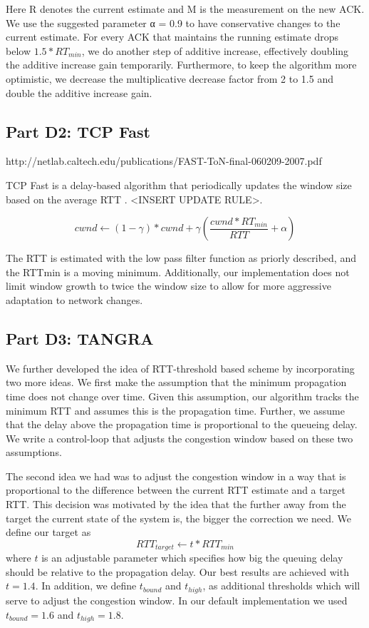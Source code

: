 \documentclass[12pt]{article}
\begin{document}
Here R denotes the current estimate and M is the measurement on the new ACK. We
use the suggested parameter α = 0.9 to have conservative changes to the current
estimate. For every ACK that maintains the running estimate drops below
$1.5*RT_{min}$, we do another step of additive increase, effectively doubling
the additive increase gain temporarily. Furthermore, to keep the algorithm more
optimistic, we decrease the multiplicative decrease factor from 2 to 1.5 and
double the additive increase gain.

\subsection*{Part D2: TCP Fast}

http://netlab.caltech.edu/publications/FAST-ToN-final-060209-2007.pdf

TCP Fast is a delay-based algorithm that periodically updates the window size
based on the average RTT \cite{jacobson}. <INSERT UPDATE RULE>.

$$cwnd \leftarrow (1 - \gamma)* cwnd + \gamma \left(\frac{cwnd * {RT_{min}}}{RTT} + \alpha \right)$$

The RTT is estimated with the low pass filter function as priorly described, and
the RTTmin is a moving minimum. Additionally, our implementation does not limit
window growth to twice the window size to allow for more aggressive adaptation
to network changes. 

\subsection*{Part D3: TANGRA}

We further developed the idea of RTT-threshold based scheme by incorporating two
more ideas. We first make the assumption that the minimum propagation time does
not change over time. Given this assumption, our algorithm tracks the minimum
RTT and assumes this is the propagation time. Further, we assume that the delay
above the propagation time is proportional to the queueing delay. We write a
control-loop that adjusts the congestion window based on these two assumptions.

The second idea we had was to adjust the congestion window in a way that is
proportional to the difference between the current RTT estimate and a target
RTT. This decision was motivated by the idea that the further away from the
target the current state of the system is, the bigger the correction we need. We
define our target as
$$RTT_{target} \leftarrow t * {RTT}_{min}$$
where $t$ is an adjustable parameter which specifies how big the queuing delay
should be relative to the propagation delay. Our best results are achieved with
$t = 1.4$. In addition, we define $t_{bound}$ and $t_{high}$, as additional
thresholds which will serve to adjust the congestion window. In our default
implementation we used $t_{bound} = 1.6$ and $t_{high} = 1.8$.
\end{document}
